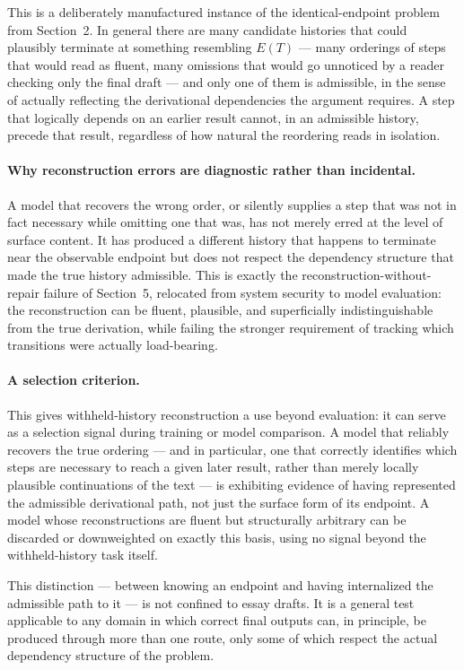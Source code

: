 \documentclass[11pt]{article}
\begin{document}
This is a deliberately manufactured instance of the identical-endpoint problem from Section~2. In general there are many candidate histories that could plausibly terminate at something resembling $E(T)$ --- many orderings of steps that would read as fluent, many omissions that would go unnoticed by a reader checking only the final draft --- and only one of them is admissible, in the sense of actually reflecting the derivational dependencies the argument requires. A step that logically depends on an earlier result cannot, in an admissible history, precede that result, regardless of how natural the reordering reads in isolation.

\paragraph{Why reconstruction errors are diagnostic rather than incidental.} A model that recovers the wrong order, or silently supplies a step that was not in fact necessary while omitting one that was, has not merely erred at the level of surface content. It has produced a different history that happens to terminate near the observable endpoint but does not respect the dependency structure that made the true history admissible. This is exactly the reconstruction-without-repair failure of Section~5, relocated from system security to model evaluation: the reconstruction can be fluent, plausible, and superficially indistinguishable from the true derivation, while failing the stronger requirement of tracking which transitions were actually load-bearing.

\paragraph{A selection criterion.} This gives withheld-history reconstruction a use beyond evaluation: it can serve as a selection signal during training or model comparison. A model that reliably recovers the true ordering --- and in particular, one that correctly identifies which steps are necessary to reach a given later result, rather than merely locally plausible continuations of the text --- is exhibiting evidence of having represented the admissible derivational path, not just the surface form of its endpoint. A model whose reconstructions are fluent but structurally arbitrary can be discarded or downweighted on exactly this basis, using no signal beyond the withheld-history task itself.

This distinction --- between knowing an endpoint and having internalized the admissible path to it --- is not confined to essay drafts. It is a general test applicable to any domain in which correct final outputs can, in principle, be produced through more than one route, only some of which respect the actual dependency structure of the problem.
\end{document}
